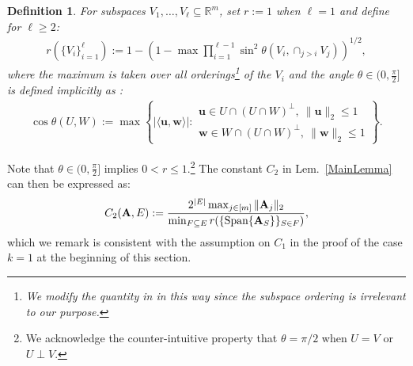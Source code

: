 \documentclass[9pt,twocolumn]{pnas-new}
\newtheorem{definition}{Definition}
\begin{document}
\begin{definition}\label{SpecialSupportSet}\label{FriedrichsDefinition}
For subspaces $V_1, \ldots, V_\ell \subseteq \mathbb{R}^m$, set $r := 1$ when $\ell = 1$ and define for $\ell \geq 2$:
\begin{align*}
r(\{V_i\}_{i=1}^\ell) := 1 - \left(1 -  \max \prod_{i=1}^{\ell-1} \sin^2  \theta \left(V_i, \cap_{j>i} V_j \right)  \right)^{1/2},
\end{align*} 
%
where the maximum is taken over all orderings\footnote{We modify the quantity in \cite{Deutsch12} in this way since the subspace ordering is irrelevant to our purpose.} of the $V_i$ and the angle $\theta \in (0,\frac{\pi}{2}]$ is defined implicitly as \cite[Def.~9.4]{Deutsch12}:
\begin{align*}
\cos{\theta(U,W)} := \max\left\{ |\langle \mathbf{u}, \mathbf{w} \rangle|: \substack{ \mathbf{u} \in U \cap (U \cap W)^\perp, \ \|\mathbf{u}\|_2 \leq 1 \\ \mathbf{w} \in W \cap (U \cap W)^\perp, \  \|\mathbf{w}\|_2 \leq 1 } \right\}.
\end{align*}
\end{definition}
Note that $\theta \in (0,\frac{\pi}{2}]$ implies $0 < r \leq 1$.\footnote{We acknowledge the counter-intuitive property that $\theta =  \pi/2$ when $U = V$ or $U \perp V$.}  %
The constant $C_2$ in Lem.~\ref{MainLemma} can then be expressed as:  %
\begin{align}\label{Cdef2}
C_2(\mathbf{A}, E) := \frac{ 2^{|E|} \max_{j \in [m]} \|\mathbf{A}_j\|_2}{ \min_{F \subseteq E} r( \{ \text{\rm Span}\{\mathbf{A}_{S}\} \}_{S \in F}) },
\end{align}
%
which we remark is consistent with the assumption on $C_1$ in the proof of the case $k=1$ at the beginning of this section.
\end{document}
